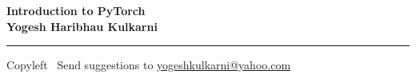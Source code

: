 
\graphicspath{{images/}}

\footnotesize


\begin{center}
\Large{\textbf{Introduction to PyTorch\\ Yogesh Haribhau Kulkarni}}  
\end{center}

\begin{multicols}{2}

\end{multicols}

\rule{\linewidth}{0.25pt}
\scriptsize
Copyleft \textcopyleft\  Send suggestions to 
\href{http://yati.io}{yogeshkulkarni@yahoo.com}


